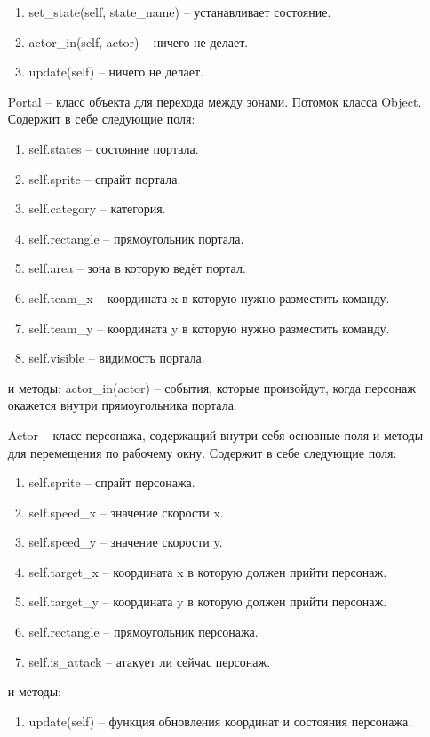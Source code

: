 \begin{enumerate}
\begin{enumerate}
		\item set\_state(self, state\_name) -- устанавливает состояние.
		\item actor\_in(self, actor) -- ничего не делает.
		\item update(self) -- ничего не делает.
	\end{enumerate}
	\item[Portal] -- класс объекта для перехода между зонами. Потомок класса Object. Содержит в себе следующие поля:
	\begin{enumerate}
		\item self.states -- состояние портала.
		\item self.sprite -- спрайт портала.
		\item self.category -- категория.
		\item self.rectangle -- прямоугольник портала.
		\item self.area -- зона в которую ведёт портал.
		\item self.team\_x -- координата x в  которую нужно разместить команду.
		\item self.team\_y -- координата y в  которую нужно разместить команду.
		\item self.visible -- видимость портала.
	\end{enumerate}
	и методы:
		actor\_in(actor) -- события, которые произойдут, когда персонаж окажется внутри прямоугольника портала.
	\item[Actor] -- класс персонажа, содержащий внутри себя основные поля и методы для перемещения по рабочему окну. Содержит в себе следующие поля:
	\begin{enumerate}
		\item self.sprite -- спрайт персонажа.
		\item self.speed\_x -- значение скорости x.
		\item self.speed\_y -- значение скорости y.
		\item self.target\_x -- координата x в которую должен прийти персонаж.
		\item self.target\_y -- координата y в которую должен прийти персонаж.
		\item self.rectangle -- прямоугольник персонажа.
		\item self.is\_attack -- атакует ли сейчас персонаж.
	\end{enumerate}
	и методы:
	\begin{enumerate}
		\item update(self) -- функция обновления координат и состояния персонажа.

\end{enumerate}
\end{enumerate}
